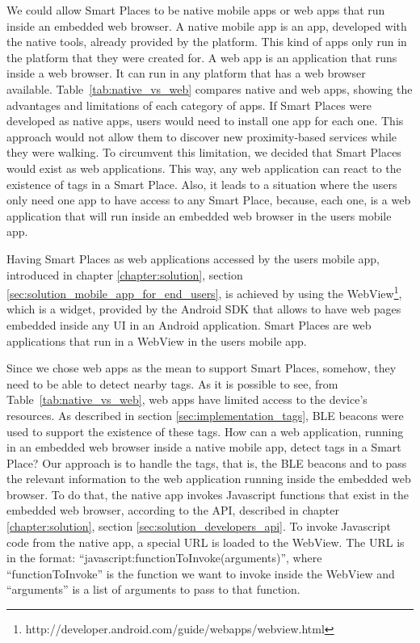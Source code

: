 We could allow Smart Places to be native mobile apps or web apps that run inside an embedded web browser.
A native mobile app is an app, developed with the native tools, already provided by the platform.
This kind of apps only run in the platform that they were created for.
A web app is an application that runs inside a web browser. It can run in any platform that has a web browser available.
Table~\ref{tab:native_vs_web} compares native and web apps, showing the advantages and limitations of each category of apps.
If Smart Places were developed as native apps, users would need to install one app for each one.
This approach would not allow them to discover new proximity-based services while they were walking.
To circumvent this limitation, we decided that Smart Places would exist as web applications.
This way, any web application can react to the existence of tags in a Smart Place. Also, it leads to a situation where the users only need one app to have access to any Smart Place, because, each one, is a web application that will run inside an embedded web browser in the users mobile app.



Having Smart Places as web applications accessed by the users mobile app, introduced in chapter \ref{chapter:solution}, section \ref{sec:solution_mobile_app_for_end_users}, is achieved by using the WebView\footnote{http://developer.android.com/guide/webapps/webview.html}, which is a widget, provided by the Android \gls{SDK} that allows to have web pages embedded inside any \gls{UI} in an Android application.
Smart Places are web applications that run in a WebView in the users mobile app.

Since we chose web apps as the mean to support Smart Places, somehow, they need to be able to detect nearby tags.
As it is possible to see, from Table~\ref{tab:native_vs_web}, web apps have limited access to the device's resources.
As described in section \ref{sec:implementation_tags}, \gls{BLE} beacons were used to support the existence of these tags.
How can a web application, running in an embedded web browser inside a native mobile app, detect tags in a Smart Place?
Our approach is to handle the tags, that is, the \gls{BLE} beacons and to pass the relevant information to the web application running inside the embedded web browser.
To do that, the native app invokes Javascript functions that exist in the embedded web browser, according to the \gls{API}, described in chapter \ref{chapter:solution}, section \ref{sec:solution_developers_api}.
To invoke Javascript code from the native app, a special \gls{URL} is loaded to the WebView.
The \gls{URL} is in the format: ``javascript:functionToInvoke(arguments)'', where ``functionToInvoke'' is the function we want to invoke inside the WebView and ``arguments'' is a list of arguments to pass to that function.

